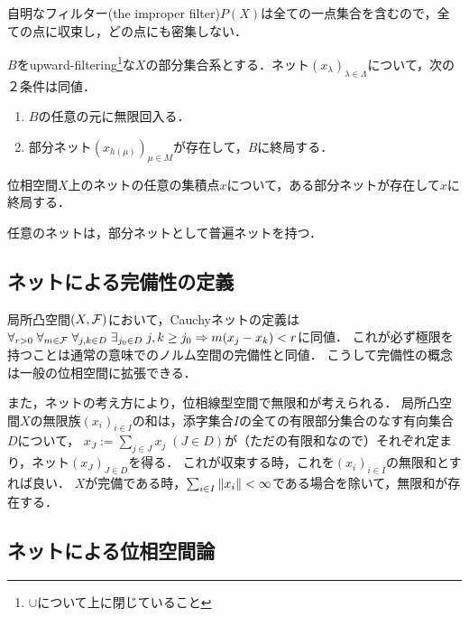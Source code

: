 \documentclass[uplatex,dvipdfmx]{jsreport}
\begin{document}
\begin{example}
    自明なフィルター(the improper filter)$P(X)$は全ての一点集合を含むので，全ての点に収束し，どの点にも密集しない．
\end{example}

\begin{lemma}[集積点の特徴付け]
    $B$をupward-filtering\footnote{$\cup$について上に閉じていること}な$X$の部分集合系とする．ネット$(x_\lambda)_{\lambda\in\Lambda}$について，次の２条件は同値．
    \begin{enumerate}
        \item $B$の任意の元に無限回入る．
        \item 部分ネット$(x_{h(\mu)})_{\mu\in M}$が存在して，$B$に終局する．
    \end{enumerate}
\end{lemma}

\begin{corollary}
    位相空間$X$上のネットの任意の集積点$x$について，ある部分ネットが存在して$x$に終局する．
\end{corollary}

\begin{theorem}
    任意のネットは，部分ネットとして普遍ネットを持つ．
\end{theorem}

\subsection{ネットによる完備性の定義}

局所凸空間$(X,\mathcal{F})$において，Cauchyネットの定義は$\forall_{r>0}\;\forall_{m\in\mathcal{F}}\;\forall_{j,k\in D}\;\exists_{j_0\in D}\;j,k\ge j_0\Rightarrow m(x_j-x_k)<r$に同値．
これが必ず極限を持つことは通常の意味でのノルム空間の完備性と同値．
こうして完備性の概念は一般の位相空間に拡張できる．

また，ネットの考え方により，位相線型空間で無限和が考えられる．
局所凸空間$X$の無限族$(x_i)_{i\in I}$の和は，添字集合$I$の全ての有限部分集合のなす有向集合$D$について，
$x_J:=\sum_{j\in J}x_j\;(J\in D)$が（ただの有限和なので）それぞれ定まり，ネット$(x_J)_{J\in D}$を得る．
これが収束する時，これを$(x_i)_{i\in I}$の無限和とすれば良い．
$X$が完備である時，$\sum_{i\in I}\|x_i\|<\infty$である場合を除いて，無限和が存在する．

\subsection{ネットによる位相空間論}
\end{document}

